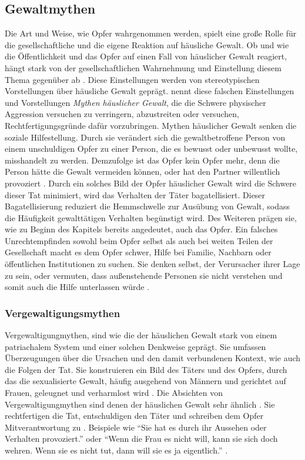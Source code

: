 \subsection{Gewaltmythen}   \label{subsec_2.1.3}
Die Art und Weise, wie Opfer wahrgenommen werden, spielt eine große Rolle für die gesellschaftliche und die eigene Reaktion auf häusliche Gewalt. Ob und wie die Öffentlichkeit und das Opfer auf einen Fall von häuslicher Gewalt reagiert, hängt stark von der gesellschaftlichen Wahrnehmung und Einstellung diesem Thema gegenüber ab \parencite{Labelingtheory_plus}. Diese Einstellungen werden von stereotypischen Vorstellungen über häusliche Gewalt geprägt. \textcite{DVMAS_Peters} nennt diese falschen Einstellungen und Vorstellungen \textit{Mythen häuslicher Gewalt}, die die Schwere physischer Aggression versuchen zu verringern, abzustreiten oder versuchen, Rechtfertigungsgründe dafür vorzubringen. Mythen häuslicher Gewalt senken die soziale Hilfestellung. Durch sie verändert sich die gewaltbetroffene Person von einem unschuldigen Opfer zu einer Person, die es bewusst oder unbewusst wollte, misshandelt zu werden. Demzufolge ist das Opfer kein Opfer mehr, denn die Person hätte die Gewalt vermeiden können, oder hat den Partner willentlich provoziert \parencite{DVMAS_Peters}. Durch ein solches Bild der Opfer häuslicher Gewalt wird die Schwere dieser Tat minimiert, wird das Verhalten der Täter bagatellisiert. Dieser Bagatellisierung reduziert die Hemmschwelle zur Ausübung von Gewalt, sodass die Häufigkeit gewalttätigen Verhalten begünstigt wird. Des Weiteren prägen sie, wie zu Beginn des Kapitels bereits angedeutet, auch das Opfer. Ein falsches Unrechtempfinden sowohl beim Opfer selbst als auch bei weiten Teilen der Gesellschaft macht es dem Opfer schwer, Hilfe bei Familie, Nachbarn oder öffentlichen Institutionen zu suchen. Sie denken selbst, der Verursacher ihrer Lage zu sein, oder vermuten, dass außenstehende Personen sie nicht verstehen und somit auch die Hilfe unterlassen würde \parencite{Gewaltmythen}.

\subsubsection{Vergewaltigungsmythen}  \label{2.1.3.1}
Vergewaltigungmythen, sind wie die der häuslichen Gewalt stark von einem patriachalem System und einer solchen Denkweise geprägt. Sie umfassen Überzeugungen über die Ursachen und den damit verbundenen Kontext, wie auch die Folgen der Tat. Sie konstruieren ein Bild des Täters und des Opfers, durch das die sexualisierte Gewalt, häufig ausgehend von Männern und gerichtet auf Frauen, geleugnet und verharmlost wird \parencite{Vergewaltigung_Bohner_1996}. Die Absichten von Vergewaltigungmythen sind denen der häuslichen Gewalt sehr ähnlich \parencite{DVMAS_Peters}. Sie rechtfertigen die Tat, entschuldigen den Täter und schreiben dem Opfer Mitverantwortung zu \parencite{Vergewaltigung_Boris_2004}. Beispiele wie \enquote{Sie hat es durch ihr Aussehen oder Verhalten provoziert.} oder \enquote{Wenn die Frau es nicht will, kann sie sich doch wehren. Wenn sie es nicht tut, dann will sie es ja eigentlich.} \parencite{Vergewaltigung_Boris_2004}.

